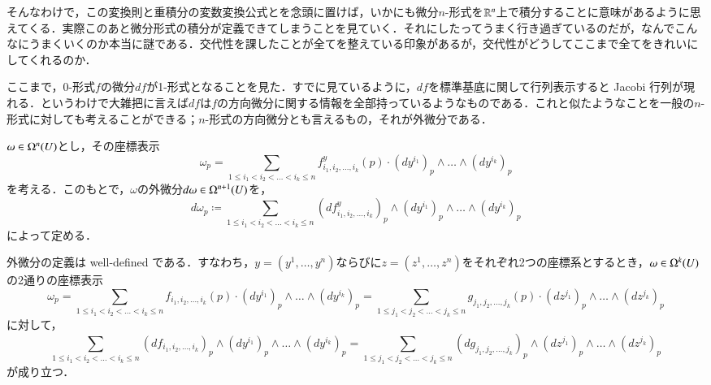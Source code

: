 \begin{que}[*]
そんなわけで，この変換則と重積分の変数変換公式とを念頭に置けば，いかにも微分$n$-形式を$\mathbb{R}^n$上で積分することに意味があるように思えてくる．実際このあと微分形式の積分が定義できてしまうことを見ていく．それにしたってうまく行き過ぎているのだが，なんでこんなにうまくいくのか本当に謎である．交代性を課したことが全てを整えている印象があるが，交代性がどうしてここまで全てをきれいにしてくれるのか．
\end{que}

ここまで，0-形式$f$の微分$df$が1-形式となることを見た．すでに見ているように，$df$を標準基底に関して行列表示すると Jacobi 行列が現れる．というわけで大雑把に言えば$df$は$f$の方向微分に関する情報を全部持っているようなものである．これと似たようなことを一般の$n$-形式に対しても考えることができる；$n$-形式の方向微分とも言えるもの，それが外微分である．

\begin{defi}$\omega \in \Omega^n(U)$とし，その座標表示
\begin{equation}
\omega_p = \sum_{1 \leq i_1 < i_2 < \dots < i_k \leq n} {f^y_{i_1,i_2,\dots,i_k}}(p) \cdot \left( dy^{i_1} \right)_p \wedge \dots \wedge \left( dy^{i_k} \right)_p
\end{equation}を考える．このもとで，$\omega$の外微分$d \omega \in \Omega^{n+1}(U)$を，
\begin{equation}
d\omega_p \coloneqq \sum_{1 \leq i_1 < i_2 < \dots < i_k \leq n} \left(df^y_{i_1,i_2,\dots,i_k}\right)_p \wedge \left( dy^{i_1} \right)_p \wedge \dots \wedge \left( dy^{i_k} \right)_p
\end{equation}
によって定める．
\end{defi}

\begin{prop}
外微分の定義は well-defined である．すなわち，$y=(y^1, \dots, y^n)$ならびに$z = (z^1, \dots, z^n)$をそれぞれ2つの座標系とするとき，$\omega \in \Omega^k(U)$の2通りの座標表示
\begin{equation}
\omega_p = \sum_{1 \leq i_1 < i_2 < \dots < i_k \leq n} {f_{i_1,i_2,\dots,i_k}}(p) \cdot \left( dy^{i_1} \right)_p \wedge \dots \wedge \left( dy^{i_k} \right)_p = \sum_{1 \leq j_1 < j_2 < \dots < j_k \leq n} {g_{j_1,j_2,\dots,j_k}}(p) \cdot \left( dz^{j_1} \right)_p \wedge \dots \wedge \left( dz^{j_k} \right)_p
\end{equation}
に対して，
\begin{equation}
\sum_{1 \leq i_1 < i_2 < \dots < i_k \leq n} \left( {df_{i_1,i_2,\dots,i_k}} \right)_p \wedge \left( dy^{i_1} \right)_p \wedge \dots \wedge \left( dy^{i_k} \right)_p = \sum_{1 \leq j_1 < j_2 < \dots < j_k \leq n} \left( {dg_{j_1,j_2,\dots,j_k}} \right)_p \wedge \left( dz^{j_1} \right)_p \wedge \dots \wedge \left( dz^{j_k} \right)_p
\end{equation}が成り立つ．
\end{prop}

